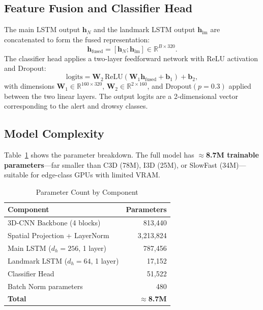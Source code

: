 \documentclass[journal]{IEEEtran}
\begin{document}
\subsection{Feature Fusion and Classifier Head}
\label{sec:head}

The main LSTM output $\mathbf{h}_N$ and the landmark LSTM output $\mathbf{h}_{\text{lm}}$ are concatenated to form the fused representation:
\begin{equation}
\mathbf{h}_{\text{fused}} = [\mathbf{h}_N; \mathbf{h}_{\text{lm}}] \in \mathbb{R}^{B \times 320}.
\end{equation}
The classifier head applies a two-layer feedforward network with ReLU activation and Dropout:
\begin{equation}
\text{logits} = \mathbf{W}_2 \, \text{ReLU}\!\left(\mathbf{W}_1 \mathbf{h}_{\text{fused}} + \mathbf{b}_1\right) + \mathbf{b}_2,
\label{eq:classifier}
\end{equation}
with dimensions $\mathbf{W}_1 \in \mathbb{R}^{160 \times 320}$, $\mathbf{W}_2 \in \mathbb{R}^{2 \times 160}$, and Dropout$(p{=}0.3)$ applied between the two linear layers. The output logits are a 2-dimensional vector corresponding to the alert and drowsy classes.

\subsection{Model Complexity}
\label{sec:complexity}

Table~\ref{tab:params} shows the parameter breakdown. The full model has $\approx$\textbf{8.7M trainable parameters}---far smaller than C3D (78M), I3D (25M), or SlowFast (34M)---suitable for edge-class GPUs with limited VRAM.

\begin{table}[t]
  \caption{Parameter Count by Component}
  \label{tab:params}
  \centering
  \begin{tabular}{lr}
    \toprule
    Component & Parameters \\
    \midrule
    3D-CNN Backbone (4 blocks) & 813{,}440 \\
    Spatial Projection + LayerNorm & 3{,}213{,}824 \\
    Main LSTM ($d_h{=}256$, 1 layer) & 787{,}456 \\
    Landmark LSTM ($d_h{=}64$, 1 layer) & 17{,}152 \\
    Classifier Head & 51{,}522 \\
    Batch Norm parameters & 480 \\
    \midrule
    \textbf{Total} & $\approx$\textbf{8.7M} \\
    \bottomrule
  \end{tabular}
\end{table}
\end{document}
